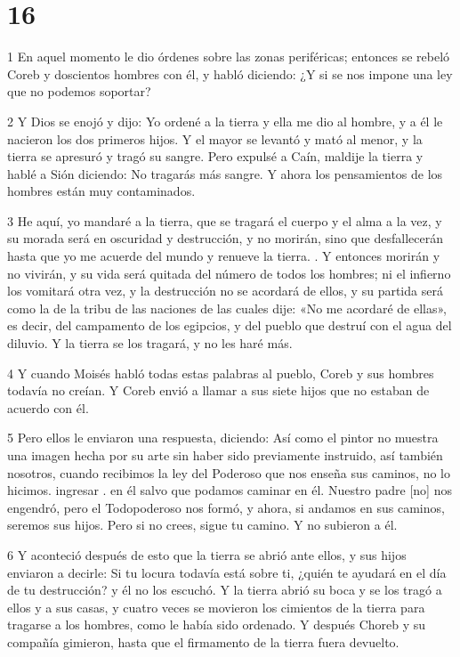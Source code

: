 \chapter{16}

\par 1 En aquel momento le dio órdenes sobre las zonas periféricas; entonces se rebeló Coreb y doscientos hombres con él, y habló diciendo: ¿Y si se nos impone una ley que no podemos soportar?

\par 2 Y Dios se enojó y dijo: Yo ordené a la tierra y ella me dio al hombre, y a él le nacieron los dos primeros hijos. Y el mayor se levantó y mató al menor, y la tierra se apresuró y tragó su sangre. Pero expulsé a Caín, maldije la tierra y hablé a Sión diciendo: No tragarás más sangre. Y ahora los pensamientos de los hombres están muy contaminados.

\par 3 He aquí, yo mandaré a la tierra, que se tragará el cuerpo y el alma a la vez, y su morada será en oscuridad y destrucción, y no morirán, sino que desfallecerán hasta que yo me acuerde del mundo y renueve la tierra. . Y entonces morirán y no vivirán, y su vida será quitada del número de todos los hombres; ni el infierno los vomitará otra vez, y la destrucción no se acordará de ellos, y su partida será como la de la tribu de las naciones de las cuales dije: «No me acordaré de ellas», es decir, del campamento de los egipcios, y del pueblo que destruí con el agua del diluvio. Y la tierra se los tragará, y no les haré más.

\par 4 Y cuando Moisés habló todas estas palabras al pueblo, Coreb y sus hombres todavía no creían. Y Coreb envió a llamar a sus siete hijos que no estaban de acuerdo con él.

\par 5 Pero ellos le enviaron una respuesta, diciendo: Así como el pintor no muestra una imagen hecha por su arte sin haber sido previamente instruido, así también nosotros, cuando recibimos la ley del Poderoso que nos enseña sus caminos, no lo hicimos. ingresar . en él salvo que podamos caminar en él. Nuestro padre [no] nos engendró, pero el Todopoderoso nos formó, y ahora, si andamos en sus caminos, seremos sus hijos. Pero si no crees, sigue tu camino. Y no subieron a él.

\par 6 Y aconteció después de esto que la tierra se abrió ante ellos, y sus hijos enviaron a decirle: Si tu locura todavía está sobre ti, ¿quién te ayudará en el día de tu destrucción? y él no los escuchó. Y la tierra abrió su boca y se los tragó a ellos y a sus casas, y cuatro veces se movieron los cimientos de la tierra para tragarse a los hombres, como le había sido ordenado. Y después Choreb y su compañía gimieron, hasta que el firmamento de la tierra fuera devuelto.

